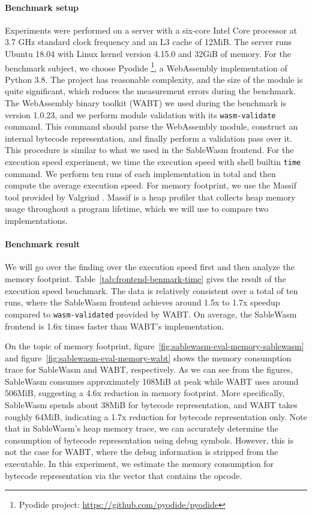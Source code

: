 \paragraph{Benchmark setup}
Experiments were performed on a server with a six-core Intel Core processor at
3.7 GHz standard clock frequency and an L3 cache of 12MiB. The server runs
Ubuntu 18.04 with Linux kernel version 4.15.0 and 32GiB of memory. For the
benchmark subject, we choose Pyodide \footnote{Pyodide project:
  \url{https://github.com/pyodide/pyodide}}, a WebAssembly implementation of
Python 3.8. The project has reasonable complexity, and the size of the module is
quite significant, which reduces the measurement errors during the benchmark.
The WebAssembly binary toolkit (WABT) we used during the benchmark is version
1.0.23, and we perform module validation with its \texttt{wasm-validate}
command. This command should parse the WebAssembly module, construct an internal
bytecode representation, and finally perform a validation pass over it. This
procedure is similar to what we used in the SableWasm frontend. For the
execution speed experiment, we time the execution speed with shell builtin
\texttt{time} command. We perform ten runs of each implementation in total and
then compute the average execution speed. For memory footprint, we use the
Massif tool provided by Valgrind \cite{valgrind-paper}. Massif is a heap
profiler that collects heap memory usage throughout a program lifetime, which we
will use to compare two implementations.

\paragraph{Benchmark result}
We will go over the finding over the execution speed first and then analyze the
memory footprint. Table~\ref{tab:frontend-benmark-time} gives the result of the
execution speed benchmark. The data is relatively consistent over a total of ten
runs, where the SableWasm frontend achieves around 1.5x to 1.7x speedup compared
to \texttt{wasm-validated} provided by WABT. On average, the SableWasm frontend
is 1.6x times faster than WABT's implementation.



On the topic of memory footprint,
figure~\ref{fig:sablewasm-eval-memory-sablewasm} and
figure~\ref{fig:sablewasm-eval-memory-wabt} shows the memory consumption trace
for SableWasm and WABT, respectively. As we can see from the figures, SableWasm
consumes approximately 108MiB at peak while WABT uses around 506MiB, suggesting
a 4.6x reduction in memory footprint. More specifically, SableWasm spends about
38MiB for bytecode representation, and WABT takes roughly 64MiB, indicating a
1.7x reduction for bytecode representation only. Note that in SableWasm's heap
memory trace, we can accurately determine the consumption of bytecode
representation using debug symbols. However, this is not the case for WABT,
where the debug information is stripped from the executable. In this experiment,
we estimate the memory consumption for bytecode representation via the vector
that contains the opcode.

